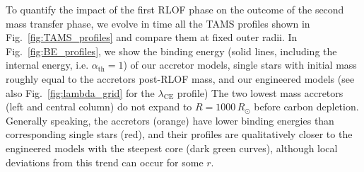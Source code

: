 \documentclass[twocolumn,twocolappendix,trackchanges]{aastex63}
\DeclareRobustCommand{\Eqref}[1]{Eq.~\ref{#1}}
\DeclareRobustCommand{\Figref}[1]{Fig.~\ref{#1}}
\newcommand{\todo}[1]{{\large $\blacksquare$~\textbf{\color{red}[#1]}}~$\blacksquare$}
\begin{document}
To quantify the impact of the first RLOF phase on the outcome of the
second mass transfer phase, we evolve in time all the TAMS profiles
shown in \Figref{fig:TAMS_profiles} and compare them at fixed outer
radii. %
In \Figref{fig:BE_profiles}, we show the binding energy (solid lines,
including the internal energy, i.e. $\alpha_\mathrm{th}=1$) %
of our accretor models, single stars with initial mass roughly equal
to the accretors post-RLOF mass, and our engineered models (see also
\Figref{fig:lambda_grid} for the $\lambda_\mathrm{CE}$ profile) The two
lowest mass accretors (left and central column) do not expand to
$R=1000\, R_\odot$ before carbon depletion. Generally speaking, the
accretors (orange) have lower binding energies than corresponding
single stars (red), and their profiles are qualitatively closer to the
engineered models with the steepest core (dark green curves), although
local deviations from this trend can occur for some $r$.

\end{document}
